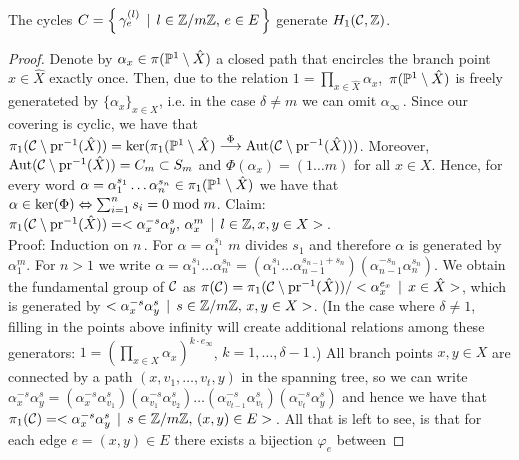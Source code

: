 \documentclass[main.tex]{subfiles}
\begin{document}
  \begin{thm}\label{thm:gen_set}
   The cycles $C = \left\{ \, \gamma_{e}^{(l)} \, \mid \, l \in \Z/m\Z, \, e \in E \, \right\}$ generate $\homo$.
  \end{thm}
  \begin{proof}
  Denote by $\alpha_x \in \pi(\P^1 \setminus \hat{X})$ a closed path that encircles the branch point $x \in \hat{X}$ exactly once. Then,  due to the relation $1 = \prod_{x \in \hat{X}} \alpha_x$,\,
  $\pi(\P^1 \setminus \hat{X})$ is freely generateted by $\{ \alpha_x \}_{x \in X}$, i.e. in the case $\delta \ne m$ we can omit $\alpha_{\infty}$\,. \abstand
  Since our covering is cyclic, we have that $
  \pi_1(\cu \setminus \pr^{-1}(\hat{X})) = \ker(\pi_1(\P^1 \setminus \hat{X}) \overset{\Phi}{\To} \Aut(\cu \setminus \pr^{-1}(\hat{X})))$. Moreover, $\Aut(\cu \setminus \pr^{-1}(\hat{X})) = C_m 
  \subset S_m$
  and $\Phi(\alpha_x) = (1 \dots m)$ for all $x \in X$. Hence, for every word $\alpha = \alpha_1^{s_1}\dots \alpha_n^{s_n} \in \pi_1(\P^1 \setminus \hat{X})$ we have that
  $\alpha \in \ker(\Phi) \eq \sum_{i=1}^n s_i = 0 \bmod m$. \abstand
  Claim: $\pi_1(\cu \setminus \pr^{-1}(\hat{X})) = < \alpha_x^{-s} \alpha_y^{s}, \, \alpha_x^m  \, \mid \, l \in \Z, x,y \in X >$\,. \\
  Proof: Induction on $n$\,. For $\alpha = \alpha_1^{s_1}$ $m$ divides $s_1$ and therefore $\alpha$ is generated by $\alpha_1^m$. For $n > 1$ we write
  $\alpha = \alpha_1^{s_1}\dots \alpha_n^{s_n} = (\alpha_1^{s_1} \dots \alpha_{n-1}^{s_{n-1}+s_n})(\alpha_{n-1}^{-s_n}\alpha_n^{s_n})$. \abstand
  We obtain the fundamental group of $\cu$ as
  $\pi(\cu) = \pi_1(\cu \setminus \pr^{-1}(\hat{X})) / < \alpha_x^{e_x} \, \mid \, x \in \hat{X} >$, which is generated by 
  $< \alpha_x^{-s} \alpha_y^{s} \, \mid \, s \in \Z/m\Z, \, x,y \in X >$. (In the case where $\delta \ne 1$, filling in the points above infinity will create additional relations among 
  these generators:
  $1 = (\prod_{x \in X} \alpha_x)^{k \cdot e_{\infty}}$, $k = 1,\dots,\delta-1$\,.) \abstand
  All branch points $x,y \in X$ are connected by a path $(x,v_1,\dots,v_t,y)$ in the spanning tree, so we can write $\alpha_x^{-s} \alpha_y^{s} = (\alpha_x^{-s}\alpha_{v_1}^{s})
  (\alpha_{v_1}^{-s}\alpha_{v_2}^{s})\dots(\alpha_{v_{t-1}}^{-s}\alpha_{v_t}^{s})(\alpha_{v_t}^{-s}\alpha_y^{s})$ and hence we have that 
  $\pi_1(\cu) = < \alpha_x^{-s} \alpha_y^{s} \, \mid \, s \in \Z/m\Z, \, (x,y) \in E >$\,. \abstand
    All that is left to see, is that for each edge $e = (x,y) \in E$ there exists a bijection $\varphi_e$ between

\end{proof}
\end{document}
